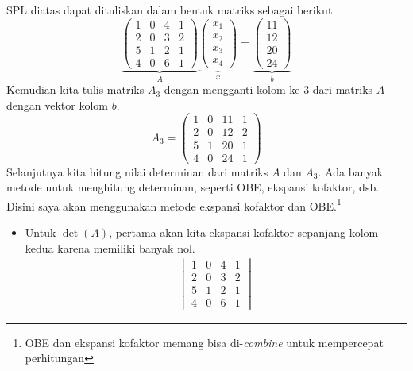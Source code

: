 \documentclass[10pt,openany,a4paper]{article}
\begin{document}
\begin{enumerate}
          SPL diatas dapat dituliskan dalam bentuk matriks sebagai berikut
          \[\underbrace{\begin{pmatrix}
                      1 & 0 & 4 & 1 \\
                      2 & 0 & 3 & 2 \\
                      5 & 1 & 2 & 1 \\
                      4 & 0 & 6 & 1
                  \end{pmatrix}}_{A}\underbrace{\begin{pmatrix}
                      x_1 \\x_2\\x_3\\x_4
                  \end{pmatrix}}_{x}=\underbrace{\begin{pmatrix}
                      11 \\12\\20\\24
                  \end{pmatrix}}_{b}\]
          Kemudian kita tulis matriks $A_3$ dengan mengganti kolom ke-3 dari matriks $A$ dengan vektor kolom $b$.
          \[A_3=\begin{pmatrix}
                  1 & 0 & 11 & 1 \\
                  2 & 0 & 12 & 2 \\
                  5 & 1 & 20 & 1 \\
                  4 & 0 & 24 & 1
              \end{pmatrix}\]
          Selanjutnya kita hitung nilai determinan dari matriks $A$ dan $A_3$. Ada banyak metode untuk menghitung determinan, seperti OBE, ekspansi kofaktor, dsb. Disini saya akan menggunakan metode ekspansi kofaktor dan OBE.\footnote{OBE dan ekspansi kofaktor memang bisa di-\textit{combine} untuk mempercepat perhitungan}
          \begin{itemize}
              \item Untuk $\det(A)$, pertama akan kita ekspansi kofaktor sepanjang kolom kedua karena memiliki banyak nol.
                    \begin{align*}
                        \begin{vmatrix}
                            1 & 0 & 4 & 1 \\
                            2 & 0 & 3 & 2 \\
                            5 & 1 & 2 & 1 \\
                            4 & 0 & 6 & 1

\end{vmatrix}
\end{align*}
\end{itemize}
\end{enumerate}
\end{document}
